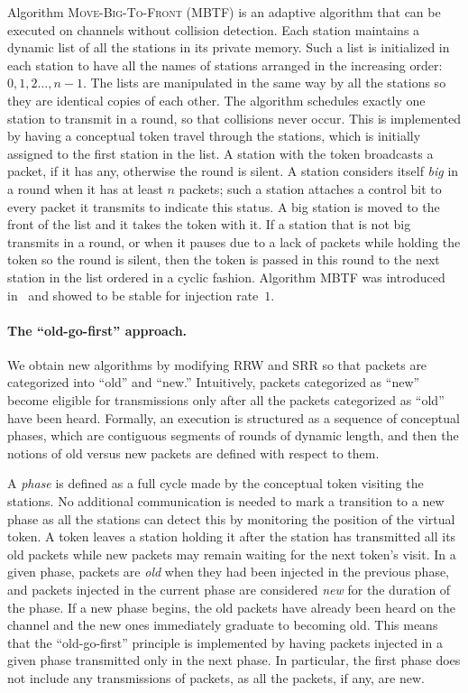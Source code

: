\documentclass[11pt]{article}
\newcommand{\BBB}{\vspace*{-\bigskipamount}}
\newcommand{\Paragraph}[1]{\BBB\paragraph{#1}}
\begin{document}
Algorithm \textsc{Move-Big-To-Front} (\textsc{MBTF}) is an adaptive algorithm that can be executed on  channels without collision detection.
Each station maintains a dynamic list of all the stations in its private memory.
Such a list is initialized in each station to have all the names of stations arranged in the increasing order:  $0,1,2\ldots, n-1$.
The lists are manipulated in the same way by all the stations so they are identical copies of each other.
The algorithm schedules exactly one station to transmit in a round, so that collisions never occur.
This is implemented by having a conceptual token travel through the stations, which is initially assigned to the first station in the list.
A station with the token broadcasts a packet, if it has any, otherwise the round is silent.
A station considers itself \emph{big} in a round when it has at least $n$ packets; such a station attaches a control bit to every packet it transmits to indicate this status.
A big station is moved to the front of the list and it takes the token with it.  
If a station that is not big transmits in a round, or when it pauses  due to a lack of packets while holding the token so the round is silent, then the token is passed in this round to the next station in the list ordered in a cyclic fashion.
Algorithm \textsc{MBTF} was introduced in~\cite{ChlebusKR09} and showed to be stable for injection rate~$1$.



\Paragraph{The ``old-go-first'' approach.}



We obtain new algorithms by modifying \textsc{RRW} and \textsc{SRR} so that packets are categorized into ``old'' and ``new.''
Intuitively, packets categorized as ``new'' become eligible for transmissions only after all the packets categorized as ``old'' have been heard.
Formally, an execution is structured as a sequence of conceptual phases, which are contiguous segments of rounds of dynamic length, and then the notions of old versus new packets are defined with respect to them.

A \emph{phase} is defined as a full cycle made by the conceptual token visiting the stations.
No additional communication is needed to mark a transition to a new phase as all the stations can detect this by monitoring the position of the virtual token.
A token leaves a station holding it after the station has transmitted all its old packets while new packets may remain waiting for the next token's visit. 
In a given phase, packets are \emph{old} when they had been injected in the previous phase, and packets injected in the current phase are considered \emph{new} for the duration of the phase.
If a new phase begins, the old packets have already been heard on the channel and the new  ones immediately graduate to becoming old.
This means that the ``old-go-first'' principle is implemented by having packets injected in a given phase transmitted only in the next phase.
In particular, the first phase does not include any transmissions of packets, as all the packets, if any, are new. 
\end{document}
